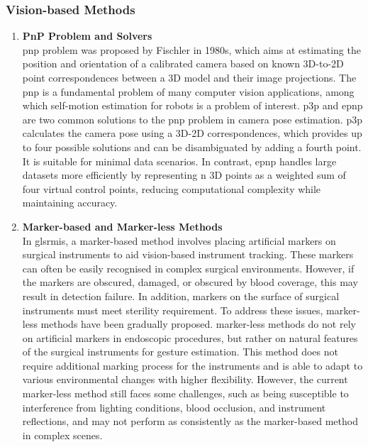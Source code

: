 \documentclass[12pt]{article}
\begin{document}
\subsubsection{Vision-based Methods}
\begin{enumerate}
      \item \textbf{PnP Problem and Solvers}
      \\\gls{pnp} problem was proposed by Fischler in 1980s, which aims at estimating the position and orientation of a calibrated camera based on known 3D-to-2D point correspondences between a 3D model and their image projections\cite{Fischler1981RandomSC}. The \gls{pnp} is a fundamental problem of many computer vision applications, among which self-motion estimation for robots is a problem of interest.
      \gls{p3p} and \gls{epnp} are two common solutions to the \gls{pnp} problem in camera pose estimation\cite{Lu_2018}. \gls{p3p} calculates the camera pose using a 3D-2D correspondences, which provides up to four possible solutions and can be disambiguated by adding a fourth point. It is suitable for minimal data scenarios. In contrast, \gls{epnp} handles large datasets more efficiently by representing n 3D points as a weighted sum of four virtual control points, reducing computational complexity while maintaining accuracy\cite{10.1007/s11263-008-0152-6}.
      
      \item \textbf{Marker-based and Marker-less Methods}
      \\In gls{rmis}, a marker-based method involves placing artificial markers on surgical instruments to aid vision-based instrument tracking\cite{villani2021development}. These markers can often be easily recognised in complex surgical environments. However, if the markers are obscured, damaged, or obscured by blood coverage, this may result in detection failure\cite{ma2021comprehensive}. In addition, markers on the surface of surgical instruments must meet sterility requirement\cite{xu2023graph}. To address these issues, marker-less methods have been gradually proposed\cite{reilink20133d}. marker-less methods do not rely on artificial markers in endoscopic procedures, but rather on natural features of the surgical instruments for gesture estimation. This method does not require additional marking process for the instruments and is able to adapt to various environmental changes with higher flexibility. However, the current marker-less method still faces some challenges, such as being susceptible to interference from lighting conditions, blood occlusion, and instrument reflections, and may not perform as consistently as the marker-based method in complex scenes\cite{hein2021towards}.
\end{enumerate}
\end{document}
